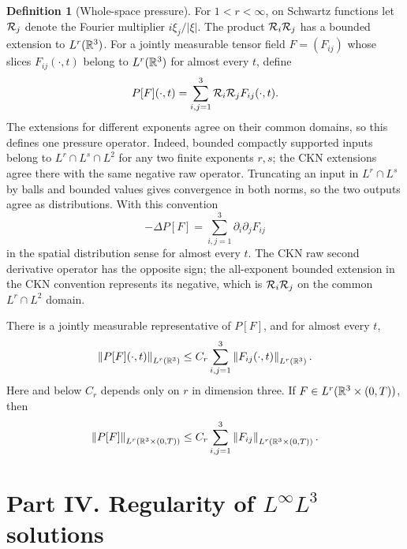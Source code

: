 \documentclass[11pt,letterpaper]{article}
\numberwithin{equation}{section}
\theoremstyle{plain}
\theoremstyle{definition}
\newtheorem{definition}[theorem]{Definition}
\theoremstyle{remark}
\begin{document}
\begin{definition}[Whole-space pressure]\label{def:riesz-pressure}
For $1<r<\infty$, on Schwartz functions let $\mathcal{R}_{j}$ denote the Fourier
multiplier $i\xi_j/|\xi|$. The product $\mathcal{R}_{i}\mathcal{R}_{j}$ has a bounded
extension to $L^r(\mathbb{R}^3)$. For a jointly measurable tensor field $F=(F_{ij})$
whose slices $F_{ij}(\cdot,t)$ belong to $L^r(\mathbb{R}^3)$ for almost every $t$,
define
\begin{equation}\label{eq:riesz-pressure}
P[F](\cdot,t)=\sum_{i,j=1}^3 \mathcal{R}_{i}\mathcal{R}_{j}F_{ij}(\cdot,t).
\end{equation}
The extensions for different exponents agree on their common domains, so this
defines one pressure operator. Indeed, bounded compactly supported inputs
belong to $L^r\cap L^s\cap L^2$ for any two finite exponents $r,s$; the CKN
extensions agree there with the same negative raw operator. Truncating an
input in $L^r\cap L^s$ by balls and bounded values gives convergence in both
norms, so the two outputs agree as distributions. With this convention
\begin{equation}\label{eq:riesz-pressure-sign}
-\Delta P[F]=\sum_{i,j=1}^3\partial_i\partial_jF_{ij}
\end{equation}
in the spatial distribution sense for almost every $t$. The CKN raw second
derivative operator has the opposite sign; the all-exponent bounded
extension in the CKN convention represents its negative, which is
$\mathcal{R}_{i}\mathcal{R}_{j}$ on the common $L^r\cap L^2$ domain.

There is a jointly measurable representative of $P[F]$, and for almost every
$t$,
\begin{equation}\label{eq:riesz-slice-bound}
\left\lVert P[F](\cdot,t)\right\rVert_{L^r(\mathbb{R}^3)}
\le C_r\sum_{i,j=1}^3\left\lVert F_{ij}(\cdot,t)\right\rVert_{L^r(\mathbb{R}^3)}.
\end{equation}
Here and below $C_r$ depends only on $r$ in dimension three. If
$F\in L^r(\mathbb{R}^3\times(0,T))$, then
\begin{equation}\label{eq:riesz-spacetime-bound}
\left\lVert P[F]\right\rVert_{L^r(\mathbb{R}^3\times(0,T))}
\le C_r\sum_{i,j=1}^3\left\lVert F_{ij}\right\rVert_{L^r(\mathbb{R}^3\times(0,T))}.
\end{equation}
\end{definition}

\part*{Part IV. Regularity of $L^\infty L^3$ solutions}
\end{document}
